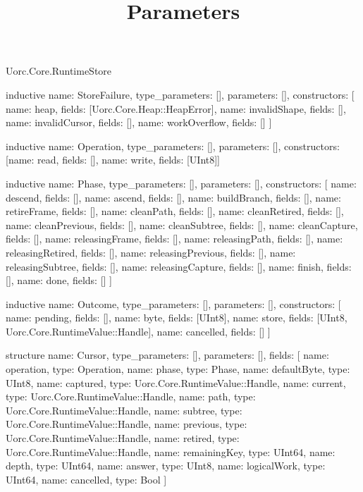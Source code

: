 \begin{lexlean}{Uorc.Core.RuntimeStore}



\title{Parameters}

\begin{semanticmodule}
inductive{
  name: StoreFailure,
  type_parameters: [],
  parameters: [],
  constructors: [
    {name: heap, fields: [Uorc.Core.Heap::HeapError]},
    {name: invalidShape, fields: []},
    {name: invalidCursor, fields: []},
    {name: workOverflow, fields: []}
  ]
}

inductive{
  name: Operation,
  type_parameters: [],
  parameters: [],
  constructors: [{name: read, fields: []}, {name: write, fields: [UInt8]}]
}

inductive{
  name: Phase,
  type_parameters: [],
  parameters: [],
  constructors: [
    {name: descend, fields: []},
    {name: ascend, fields: []},
    {name: buildBranch, fields: []},
    {name: retireFrame, fields: []},
    {name: cleanPath, fields: []},
    {name: cleanRetired, fields: []},
    {name: cleanPrevious, fields: []},
    {name: cleanSubtree, fields: []},
    {name: cleanCapture, fields: []},
    {name: releasingFrame, fields: []},
    {name: releasingPath, fields: []},
    {name: releasingRetired, fields: []},
    {name: releasingPrevious, fields: []},
    {name: releasingSubtree, fields: []},
    {name: releasingCapture, fields: []},
    {name: finish, fields: []},
    {name: done, fields: []}
  ]
}

inductive{
  name: Outcome,
  type_parameters: [],
  parameters: [],
  constructors: [
    {name: pending, fields: []},
    {name: byte, fields: [UInt8]},
    {name: store, fields: [UInt8, Uorc.Core.RuntimeValue::Handle]},
    {name: cancelled, fields: []}
  ]
}

structure{
  name: Cursor,
  type_parameters: [],
  parameters: [],
  fields: [
    {name: operation, type: Operation},
    {name: phase, type: Phase},
    {name: defaultByte, type: UInt8},
    {name: captured, type: Uorc.Core.RuntimeValue::Handle},
    {name: current, type: Uorc.Core.RuntimeValue::Handle},
    {name: path, type: Uorc.Core.RuntimeValue::Handle},
    {name: subtree, type: Uorc.Core.RuntimeValue::Handle},
    {name: previous, type: Uorc.Core.RuntimeValue::Handle},
    {name: retired, type: Uorc.Core.RuntimeValue::Handle},
    {name: remainingKey, type: UInt64},
    {name: depth, type: UInt64},
    {name: answer, type: UInt8},
    {name: logicalWork, type: UInt64},
    {name: cancelled, type: Bool}
  ]
}


\end{semanticmodule}
\end{lexlean}
